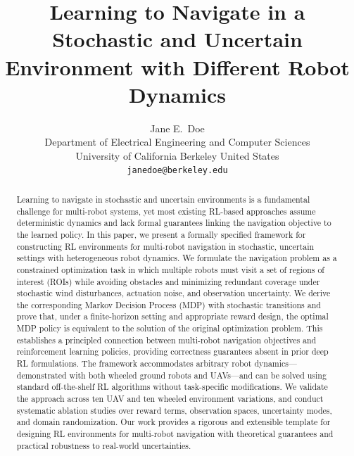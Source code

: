 \documentclass{article}
\title{Learning to Navigate in a Stochastic and Uncertain Environment with Different Robot Dynamics}
\author{
  Jane E.~Doe\\
  Department of Electrical Engineering and Computer Sciences\\
  University of California Berkeley 
  United States\\
  \texttt{janedoe@berkeley.edu} \\
}
\begin{document}
\maketitle
\thispagestyle{empty}
\pagestyle{empty}


\begin{abstract}
Learning to navigate in stochastic and uncertain environments is a fundamental challenge for multi-robot systems, yet most existing RL-based approaches assume deterministic dynamics and lack formal guarantees linking the navigation objective to the learned policy. In this paper, we present a formally specified framework for constructing RL environments for multi-robot navigation in stochastic, uncertain settings with heterogeneous robot dynamics. We formulate the navigation problem as a constrained optimization task in which multiple robots must visit a set of regions of interest (ROIs) while avoiding obstacles and minimizing redundant coverage under stochastic wind disturbances, actuation noise, and observation uncertainty. We derive the corresponding Markov Decision Process (MDP) with stochastic transitions and prove that, under a finite-horizon setting and appropriate reward design, the optimal MDP policy is equivalent to the solution of the original optimization problem. This establishes a principled connection between multi-robot navigation objectives and reinforcement learning policies, providing correctness guarantees absent in prior deep RL formulations. The framework accommodates arbitrary robot dynamics—demonstrated with both wheeled ground robots and UAVs—and can be solved using standard off-the-shelf RL algorithms without task-specific modifications. We validate the approach across ten UAV and ten wheeled environment variations, and conduct systematic ablation studies over reward terms, observation spaces, uncertainty modes, and domain randomization. Our work provides a rigorous and extensible template for designing RL environments for multi-robot navigation with theoretical guarantees and practical robustness to real-world uncertainties.
\end{abstract}
\end{document}
